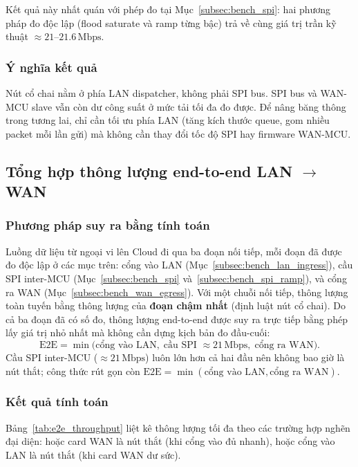 Kết quả này nhất quán với phép đo tại Mục~\ref{subsec:bench_spi}: hai phương pháp đo độc lập (flood saturate và ramp từng bậc) trả về cùng giá trị trần kỹ thuật $\approx 21$--$21{.}6\,\text{Mbps}$.

\subsubsection{Ý nghĩa kết quả}

Nút cổ chai nằm ở phía LAN dispatcher, không phải SPI bus. SPI bus và WAN-MCU slave vẫn còn dư công suất ở mức tải tối đa đo được. Để nâng băng thông trong tương lai, chỉ cần tối ưu phía LAN (tăng kích thước queue, gom nhiều packet mỗi lần gửi) mà không cần thay đổi tốc độ SPI hay firmware WAN-MCU.

\subsection{Tổng hợp thông lượng end-to-end LAN $\rightarrow$ WAN}
\label{subsec:bench_e2e_throughput}

\subsubsection{Phương pháp suy ra bằng tính toán}

Luồng dữ liệu từ ngoại vi lên Cloud đi qua ba đoạn nối tiếp, mỗi đoạn đã được đo độc lập ở các mục trên: cổng vào LAN (Mục~\ref{subsec:bench_lan_ingress}), cầu SPI inter-MCU (Mục~\ref{subsec:bench_spi} và~\ref{subsec:bench_spi_ramp}), và cổng ra WAN (Mục~\ref{subsec:bench_wan_egress}). Với một chuỗi nối tiếp, thông lượng toàn tuyến bằng thông lượng của \textbf{đoạn chậm nhất} (định luật nút cổ chai). Do cả ba đoạn đã có số đo, thông lượng end-to-end được suy ra trực tiếp bằng phép lấy giá trị nhỏ nhất mà không cần dựng kịch bản đo đầu-cuối:
\[
\text{E2E} = \min\bigl(\text{cổng vào LAN},\; \text{cầu SPI } \approx 21\,\text{Mbps},\; \text{cổng ra WAN}\bigr).
\]
Cầu SPI inter-MCU ($\approx 21\,\text{Mbps}$) luôn lớn hơn cả hai đầu nên không bao giờ là nút thắt; công thức rút gọn còn $\text{E2E} = \min(\text{cổng vào LAN}, \text{cổng ra WAN})$.

\subsubsection{Kết quả tính toán}

Bảng~\ref{tab:e2e_throughput} liệt kê thông lượng tối đa theo các trường hợp nghẽn đại diện: hoặc card WAN là nút thắt (khi cổng vào đủ nhanh), hoặc cổng vào LAN là nút thắt (khi card WAN dư sức).

